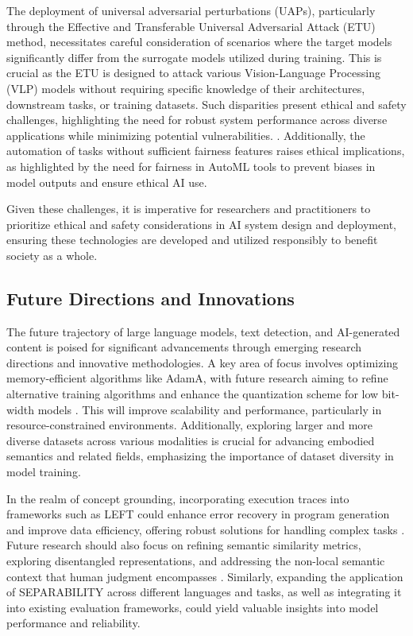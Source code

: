 The deployment of universal adversarial perturbations (UAPs), particularly through the Effective and Transferable Universal Adversarial Attack (ETU) method, necessitates careful consideration of scenarios where the target models significantly differ from the surrogate models utilized during training. This is crucial as the ETU is designed to attack various Vision-Language Processing (VLP) models without requiring specific knowledge of their architectures, downstream tasks, or training datasets. Such disparities present ethical and safety challenges, highlighting the need for robust system performance across diverse applications while minimizing potential vulnerabilities. \cite{zhang2024universaladversarialperturbationsvisionlanguage}. Additionally, the automation of tasks without sufficient fairness features raises ethical implications, as highlighted by the need for fairness in AutoML tools to prevent biases in model outputs and ensure ethical AI use.



Given these challenges, it is imperative for researchers and practitioners to prioritize ethical and safety considerations in AI system design and deployment, ensuring these technologies are developed and utilized responsibly to benefit society as a whole.



\subsection{Future Directions and Innovations} \label{subsec:Future Directions and Innovations}

The future trajectory of large language models, text detection, and AI-generated content is poised for significant advancements through emerging research directions and innovative methodologies. A key area of focus involves optimizing memory-efficient algorithms like AdamA, with future research aiming to refine alternative training algorithms and enhance the quantization scheme for low bit-width models \cite{yin2017quantizationtraininglowbitwidth}. This will improve scalability and performance, particularly in resource-constrained environments. Additionally, exploring larger and more diverse datasets across various modalities is crucial for advancing embodied semantics and related fields, emphasizing the importance of dataset diversity in model training.



In the realm of concept grounding, incorporating execution traces into frameworks such as LEFT could enhance error recovery in program generation and improve data efficiency, offering robust solutions for handling complex tasks \cite{hsu2023whatsleftconceptgrounding}. Future research should also focus on refining semantic similarity metrics, exploring disentangled representations, and addressing the non-local semantic context that human judgment encompasses \cite{yamshchikov2020styletransferparaphraselookingsensible}. Similarly, expanding the application of SEPARABILITY across different languages and tasks, as well as integrating it into existing evaluation frameworks, could yield valuable insights into model performance and reliability.



